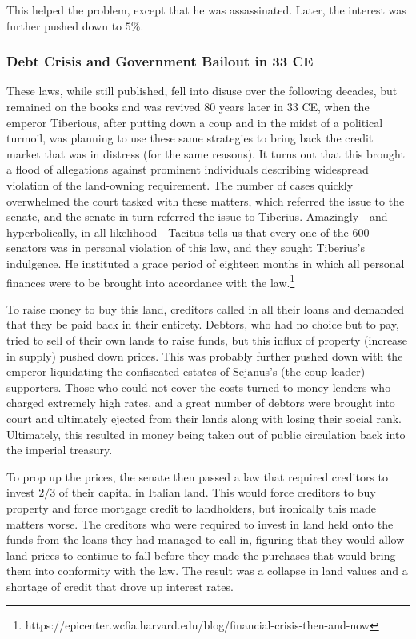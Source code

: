 \documentclass{article}
\begin{document}
      This helped the problem, except that he was assassinated. Later, the interest was further pushed down to $5\%$. 

    \subsubsection{Debt Crisis and Government Bailout in 33 CE}

      These laws, while still published, fell into disuse over the following decades, but remained on the books and was revived 80 years later in 33 CE, when the emperor Tiberious, after putting down a coup and in the midst of a political turmoil, was planning to use these same strategies to bring back the credit market that was in distress (for the same reasons). It turns out that this brought a flood of allegations against prominent individuals describing widespread violation of the land-owning requirement. The number of cases quickly overwhelmed the court tasked with these matters, which referred the issue to the senate, and the senate in turn referred the issue to Tiberius. Amazingly—and hyperbolically, in all likelihood—Tacitus tells us that every one of the 600 senators was in personal violation of this law, and they sought Tiberius’s indulgence. He instituted a grace period of eighteen months in which all personal finances were to be brought into accordance with the law.\footnote{https://epicenter.wcfia.harvard.edu/blog/financial-crisis-then-and-now}

      To raise money to buy this land, creditors called in all their loans and demanded that they be paid back in their entirety. Debtors, who had no choice but to pay, tried to sell of their own lands to raise funds, but this influx of property (increase in supply) pushed down prices. This was probably further pushed down with the emperor liquidating the confiscated estates of Sejanus's (the coup leader) supporters. Those who could not cover the costs turned to money-lenders who charged extremely high rates, and a great number of debtors were brought into court and ultimately ejected from their lands along with losing their social rank. Ultimately, this resulted in money being taken out of public circulation back into the imperial treasury. 

      To prop up the prices, the senate then passed a law that required creditors to invest $2/3$ of their capital in Italian land. This would force creditors to buy property and force mortgage credit to landholders, but ironically this made matters worse. The creditors who were required to invest in land held onto the funds from the loans they had managed to call in, figuring that they would allow land prices to continue to fall before they made the purchases that would bring them into conformity with the law. The result was a collapse in land values and a shortage of credit that drove up interest rates. 
\end{document}
